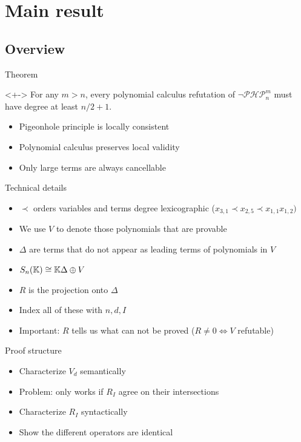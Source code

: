 \documentclass[xcolor={dvipsnames}]{beamer}
\newcommand{\Sn}{S_n(\KK)}
\newcommand{\PHP}{\ensuremath{\neg \mathcal{PHP}^m_n}\xspace}
\begin{document}
\section{Main result}
\subsection{Overview}
\begin{frame}{Theorem}
    \begin{theorem}<+->
        For any $m > n$, every polynomial calculus refutation of \PHP must have degree at least $n/2 + 1$.
    \end{theorem}
    \begin{itemize}[<+->]
        \item Pigeonhole principle is locally consistent
        \item Polynomial calculus preserves local validity
        \item Only large terms are always cancellable
    \end{itemize}
\end{frame}

\begin{frame}{Technical details}
    \begin{itemize}[<+->]
        \item $\prec$ orders variables and terms degree lexicographic ($ x_{3, 1} \prec x_{2, 5} \prec x_{1, 1} x_{1, 2} )$
        \item We use $V$ to denote those polynomials that are provable
        \item $\Delta$ are terms that do not appear as leading terms of polynomials in $V$
        \item $\Sn \cong \KK \Delta \oplus V$
        \item $R$ is the projection onto $\Delta$
        \item Index all of these with $n, d, I$
        \item Important: $R$ tells us what can not be proved ($R \neq 0 \Leftrightarrow V$ refutable)
    \end{itemize}
\end{frame}

\begin{frame}{Proof structure}
    \begin{itemize}[<+->]
        \item Characterize $V_d$ semantically
        \item Problem: only works if $R_I$ agree on their intersections
        \item Characterize $R_I$ syntactically
        \item Show the different operators are identical
    \end{itemize}
\end{frame}
\end{document}
